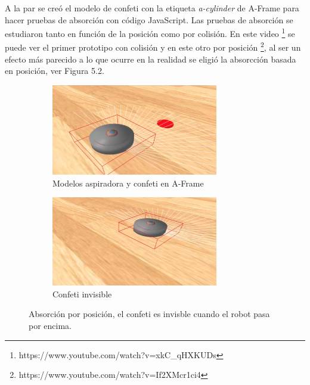 A la par se creó el modelo de confeti con la etiqueta \textit{a-cylinder} de A-Frame para hacer pruebas de absorción con código JavaScript.
Las pruebas de absorción se estudiaron tanto en función de la posición como por colisión. En este video \footnote{https://www.youtube.com/watch?v=xkC\_qHXKUDs} se puede ver el primer prototipo con colisión y en este otro  por posición \footnote{https://www.youtube.com/watch?v=If2XMcr1ci4}, al ser un efecto más parecido a lo que ocurre en la realidad se eligió la absorcción basada en posición, ver Figura 5.2.

    
\begin{figure}[H]
  \begin{subfigure}[b]{0.5\textwidth}
  \centering
    \includegraphics[width=0.8\textwidth, height=0.5\textwidth]{chapters/images/prototiporoomba.png}
    \caption{Modelos aspiradora y confeti en A-Frame}
    \label{fig:f1}
  \end{subfigure}
  \hfill
  \begin{subfigure}[b]{0.5\textwidth}
  \centering
    \includegraphics[width=0.8\textwidth, height=0.5\textwidth]{chapters/images/prototiporoomba2.png}
	\caption{Confeti invisible}    
    \label{fig:f2}
 
  \end{subfigure}
  \caption{Absorción por posición, el confeti es invisble cuando el robot pasa por encima.}
\end{figure}

